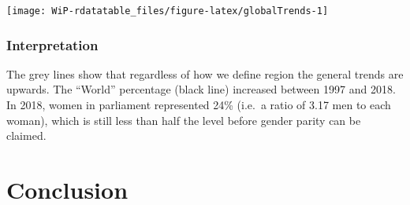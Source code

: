 \documentclass[a4paper,9pt,twocolumn,twoside,printwatermark=true]{pinp}
\begin{document}
\begin{Shaded}
\end{Shaded}

\begin{center}\texttt{[image: WiP-rdatatable\_files/figure-latex/globalTrends-1]} \end{center}

\subsubsection{Interpretation}\label{interpretation-5}

The grey lines show that regardless of how we define region the general
trends are upwards. The ``World'' percentage (black line) increased
between 1997 and 2018. In 2018, women in parliament represented 24\%
(i.e.~a ratio of 3.17 men to each woman), which is still less than half
the level before gender parity can be claimed.

\section{Conclusion}\label{conclusion}
\end{document}
